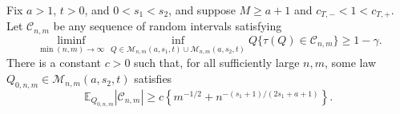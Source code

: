 Fix \(a>1\), \(t>0\), and \(0<s_1<s_2\), and suppose \(M\ge a+1\) and \(c_{T,-}<1<c_{T,+}\). Let \(\mathcal C_{n,m}\) be any sequence of random intervals satisfying
\[
\liminf_{\min(n,m)\to\infty}
\inf_{Q\in\mathcal M_{n,m}(a,s_1,t)\cup\mathcal M_{n,m}(a,s_2,t)}
Q\{\tau(Q)\in\mathcal C_{n,m}\}\ge1-\gamma.
\]
There is a constant \(c>0\) such that, for all sufficiently large \(n,m\), some law \(Q_{0,n,m}\in\mathcal M_{n,m}(a,s_2,t)\) satisfies
\[
\mathbb E_{Q_{0,n,m}}|\mathcal C_{n,m}|
\ge c\left\{m^{-1/2}+n^{-(s_1+1)/(2s_1+a+1)}\right\}.
\]